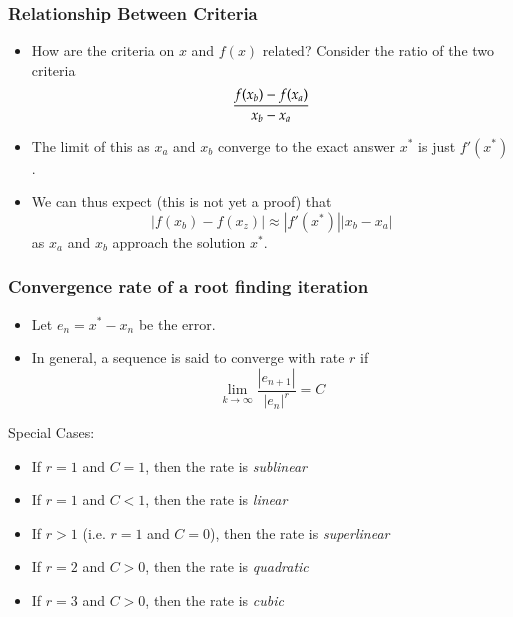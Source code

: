 \documentclass[10pt]{beamer}
\begin{document}
\begin{frame}
\frametitle{Relationship Between Criteria}
\begin{itemize}
  \item How are the criteria on $x$ and $f(x)$ related?  Consider the
    ratio of the two criteria
  \begin{equation*}
    { f(x_b) - f(x_a) \over x_b - x_a }
  \end{equation*}
  \item The limit of this as $x_a$ and $x_b$ converge to the exact
    answer $x^*$ is just $f'(x^*)$.
  \item We can thus expect (this is not yet a proof) that 
  \begin{equation*}
    | f(x_b)-f(x_z) | \approx |f'(x^*)| | x_b - x_a |
  \end{equation*}
  as $x_a$ and $x_b$ approach the solution $x^*$.
\end{itemize}
\end{frame}
\begin{frame}
\frametitle{Convergence rate of a root finding iteration}
\begin{itemize}
  \item Let $e_n = x^* - x_n$ be the error.
  \item In general, a sequence is said to converge with rate $r$ if
    \begin{equation*}
      \lim_{k\rightarrow\infty} \frac{|e_{n+1}|}{|e_{n}|^{r}} = C
    \end{equation*}
\end{itemize}
\begin{block}{Special Cases:}
\begin{itemize}
  \item If $r=1$ and $C=1$, then the rate is \emph{sublinear}
  \item If $r=1$ and $C<1$, then the rate is \emph{linear}
  \item If $r>1$ (i.e. $r=1$ and $C=0$), then the rate is \emph{superlinear}
  \item If $r=2$ and $C>0$, then the rate is \emph{quadratic}
  \item If $r=3$ and $C>0$, then the rate is \emph{cubic}
\end{itemize}
\end{block}
\end{frame}
\end{document}
